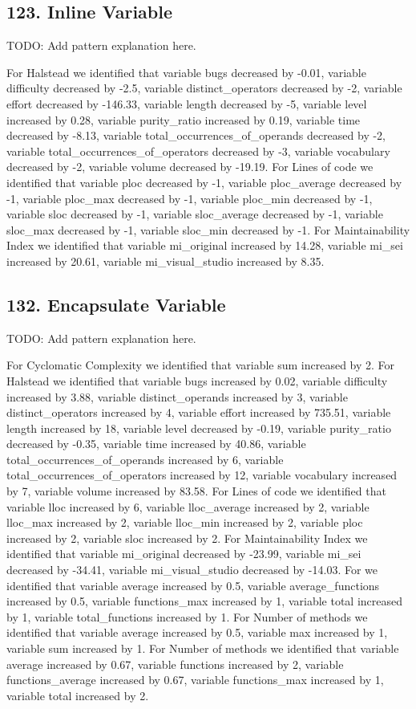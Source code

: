 \subsection{123. Inline Variable}

TODO: Add pattern explanation here.

For Halstead we identified that variable bugs decreased by -0.01, variable difficulty decreased by -2.5, variable distinct\_operators decreased by -2, variable effort decreased by -146.33, variable length decreased by -5, variable level increased by 0.28, variable purity\_ratio increased by 0.19, variable time decreased by -8.13, variable total\_occurrences\_of\_operands decreased by -2, variable total\_occurrences\_of\_operators decreased by -3, variable vocabulary decreased by -2, variable volume decreased by -19.19.
For Lines of code we identified that variable ploc decreased by -1, variable ploc\_average decreased by -1, variable ploc\_max decreased by -1, variable ploc\_min decreased by -1, variable sloc decreased by -1, variable sloc\_average decreased by -1, variable sloc\_max decreased by -1, variable sloc\_min decreased by -1.
For Maintainability Index we identified that variable mi\_original increased by 14.28, variable mi\_sei increased by 20.61, variable mi\_visual\_studio increased by 8.35.

\subsection{132. Encapsulate Variable}

TODO: Add pattern explanation here.

For Cyclomatic Complexity we identified that variable sum increased by 2.
For Halstead we identified that variable bugs increased by 0.02, variable difficulty increased by 3.88, variable distinct\_operands increased by 3, variable distinct\_operators increased by 4, variable effort increased by 735.51, variable length increased by 18, variable level decreased by -0.19, variable purity\_ratio decreased by -0.35, variable time increased by 40.86, variable total\_occurrences\_of\_operands increased by 6, variable total\_occurrences\_of\_operators increased by 12, variable vocabulary increased by 7, variable volume increased by 83.58.
For Lines of code we identified that variable lloc increased by 6, variable lloc\_average increased by 2, variable lloc\_max increased by 2, variable lloc\_min increased by 2, variable ploc increased by 2, variable sloc increased by 2.
For Maintainability Index we identified that variable mi\_original decreased by -23.99, variable mi\_sei decreased by -34.41, variable mi\_visual\_studio decreased by -14.03.
For  we identified that variable average increased by 0.5, variable average\_functions increased by 0.5, variable functions\_max increased by 1, variable total increased by 1, variable total\_functions increased by 1.
For Number of methods we identified that variable average increased by 0.5, variable max increased by 1, variable sum increased by 1.
For Number of methods we identified that variable average increased by 0.67, variable functions increased by 2, variable functions\_average increased by 0.67, variable functions\_max increased by 1, variable total increased by 2.

